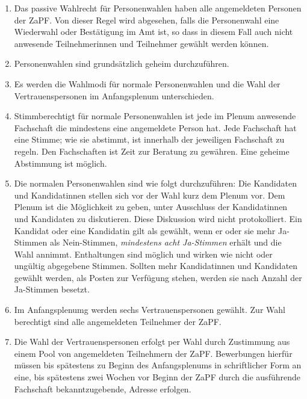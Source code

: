 \documentclass[draft,12pt,oneside]{scrreprt}
\begin{document}
\begin{enumerate}

  \item Das passive Wahlrecht für Personenwahlen haben alle angemeldeten Personen
        der ZaPF. Von dieser Regel wird abgesehen, falls die Personenwahl eine
        Wiederwahl oder Bestätigung im Amt ist, so dass in diesem Fall auch nicht
        anwesende Teilnehmerinnen und Teilnehmer gewählt werden können.

  \item Personenwahlen sind grundsätzlich geheim durchzuführen.

  \item Es werden die Wahlmodi für normale Personenwahlen und die Wahl der
        Vertrauenspersonen im Anfangsplenum unterschieden.

  \item Stimmberechtigt für normale Personenwahlen ist jede im Plenum anwesende
        Fachschaft die mindestens eine angemeldete Person hat.
        Jede Fachschaft hat eine Stimme; wie sie abstimmt, ist innerhalb der
        jeweiligen Fachschaft zu regeln.
        Den Fachschaften ist Zeit zur Beratung zu gewähren.
        Eine geheime Abstimmung ist möglich.

  \item Die normalen Personenwahlen sind wie folgt durchzuführen:
        Die Kandidaten und Kandidatinnen stellen sich vor der Wahl kurz dem
        Plenum vor.
        Dem Plenum ist die Möglichkeit zu geben, unter Ausschluss der Kandidatinnen
        und Kandidaten zu diskutieren.
        Diese Diskussion wird nicht protokolliert.
        Ein Kandidat oder eine Kandidatin gilt als gewählt, wenn er oder sie mehr
        Ja-Stimmen als Nein-Stimmen, \textit{mindestens acht Ja-Stimmen}
        erhält und die Wahl annimmt.
        Enthaltungen sind möglich und wirken wie nicht oder ungültig abgegebene
        Stimmen.
        Sollten mehr Kandidatinnen und Kandidaten gewählt werden, als Posten zur
        Verfügung stehen, werden sie nach Anzahl der Ja-Stimmen besetzt.

  \item Im Anfangsplenumg werden sechs Vertrauenspersonen gewählt. Zur Wahl
        berechtigt sind alle angemeldeten Teilnehmer der ZaPF.

  \item Die Wahl der Vertrauenspersonen erfolgt per Wahl durch
        Zustimmung aus einem Pool von angemeldeten Teilnehmern der ZaPF.
        Bewerbungen hierfür müssen bis spätestens zu Beginn des Anfangsplenums
        in schriftlicher Form an eine, bis spätestens zwei Wochen vor Beginn der
        ZaPF durch die ausführende Fachschaft bekanntzugebende, Adresse erfolgen.


\end{enumerate}
\end{document}
